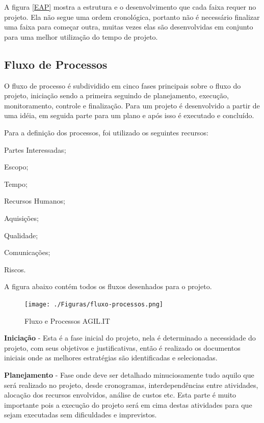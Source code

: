 A figura \ref{EAP} mostra a estrutura e o desenvolvimento que cada faixa requer no projeto. Ela não segue uma ordem cronológica, portanto não é necessário finalizar uma faixa para começar outra, muitas vezes elas são desenvolvidas em conjunto para uma melhor utilização do tempo de projeto.

\subsection{Fluxo de Processos}

{O fluxo de processo é subdividido em cinco fases principais sobre o fluxo do projeto, iniciação sendo a primeira seguindo de planejamento, execução, monitoramento, controle e finalização. Para \cite{PMG2018} um projeto é desenvolvido a partir de uma idéia, em seguida parte para um plano e após isso é executado e concluído.}

Para a definição dos processos, foi utilizado os seguintes recursos:

\begin{subalineas}
	\item {Partes Interessadas};
	\item {Escopo};
	\item {Tempo};
	\item {Recursos Humanos};
	\item {Aquisições};
	\item {Qualidade};
	\item {Comunicações};
	\item {Riscos}.
\end{subalineas}

A figura abaixo contém todos os fluxos desenhados para o projeto.

\newpage
\begin{figure}[htb]
	\caption{\label{Fluxo-Processos}Fluxo e Processos AGIL.IT}
	\begin{center}
		\texttt{[image: ./Figuras/fluxo-processos.png]}
	\end{center}
\end{figure}



{\textbf{Iniciação} - Esta é a fase inicial do projeto, nela é determinado a necessidade do projeto, com seus objetivos e justificativas, então é realizado os documentos iniciais onde as melhores estratégias são identificadas e selecionadas.}

{\textbf{Planejamento} - Fase onde deve ser detalhado minuciosamente tudo aquilo que será realizado no projeto, desde cronogramas, interdependências entre atividades, alocação dos recursos envolvidos, análise de custos etc. Esta parte é muito importante pois a execução do projeto será em cima destas atividades para que sejam executadas sem dificuldades e imprevistos.}

